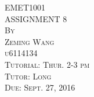 \documentclass{article}
\begin{document}




\thispagestyle{empty}

\begin{center}
\huge
\vspace*{1.0in} EMET1001 
\\\vspace{0.5in} ASSIGNMENT 8
\normalsize
\\\vspace{0.5in} \textsc{By}
\\\vspace{0.1in} \textsc{Zeming Wang}
\\\vspace{0.1in} \textsc{u6114134}
\normalsize
\\\vspace{0.5in} \textsc{Tutorial: Thur. 2-3 pm}
\\\vspace{0.1in} \textsc{Tutor: Long}
\normalsize
\\\vspace{0.5in} \textsc{Due: Sept. 27, 2016}
\end{center}

\newpage
\setcounter{page}{1}
\end{document}
